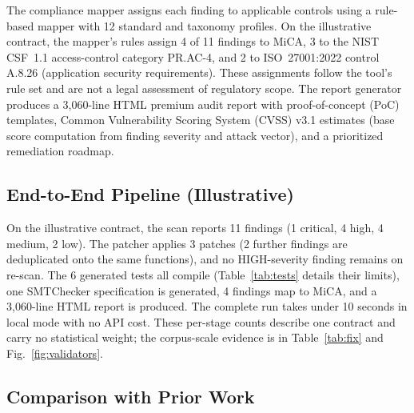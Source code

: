 \documentclass[conference]{IEEEtran}
\begin{document}
The compliance mapper assigns each finding to applicable controls using a rule-based mapper with 12 standard and taxonomy profiles. On the illustrative contract, the mapper's rules assign 4 of 11 findings to MiCA, 3 to the NIST CSF~1.1 access-control category PR.AC-4, and 2 to ISO~27001:2022 control A.8.26 (application security requirements). These assignments follow the tool's rule set and are not a legal assessment of regulatory scope. The report generator produces a 3{,}060-line HTML premium audit report with proof-of-concept (PoC) templates, Common Vulnerability Scoring System (CVSS) v3.1 estimates (base score computation from finding severity and attack vector), and a prioritized remediation roadmap.

\subsection{End-to-End Pipeline (Illustrative)}
\label{sec:e2e}

On the illustrative contract, the scan reports 11 findings (1 critical, 4 high, 4 medium, 2 low). The patcher applies 3 patches (2 further findings are deduplicated onto the same functions), and no HIGH-severity finding remains on re-scan. The 6 generated tests all compile (Table~\ref{tab:tests} details their limits), one SMTChecker specification is generated, 4 findings map to MiCA, and a 3{,}060-line HTML report is produced. The complete run takes under 10 seconds in local mode with no API cost. These per-stage counts describe one contract and carry no statistical weight; the corpus-scale evidence is in Table~\ref{tab:fix} and Fig.~\ref{fig:validators}.

\subsection{Comparison with Prior Work}
\label{sec:comparison}
\end{document}
